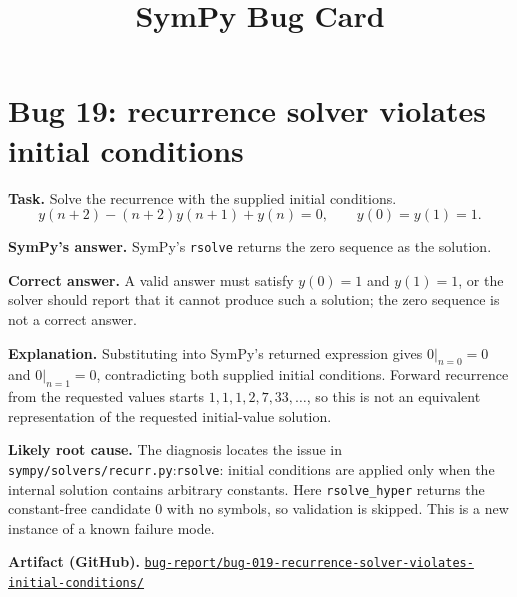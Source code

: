 \documentclass[11pt]{article}
\title{SymPy Bug Card}
\author{}
\date{}
\newcommand{\artifactrepo}{https://github.com/TODO-org/TODO-repo}
\newcommand{\bugbundle}[1]{\href{\artifactrepo/tree/main/bug-report/#1}{\nolinkurl{bug-report/#1/}}}
\begin{document}
\maketitle

\section*{Bug 19: recurrence solver violates initial conditions}

\begin{counterexamplebox}
\textbf{Task.} Solve the recurrence with the supplied initial conditions.
\[
 y(n+2)-(n+2)y(n+1)+y(n)=0,\qquad y(0)=y(1)=1 .
\]

\medskip
\textbf{SymPy's answer.}
SymPy's \texttt{rsolve} returns the zero sequence as the solution.

\medskip
\textbf{Correct answer.} A valid answer must satisfy \(y(0)=1\) and
\(y(1)=1\), or the solver should report that it cannot produce such a solution;
the zero sequence is not a correct answer.

\medskip
\textbf{Explanation.} Substituting into SymPy's returned expression gives
\(0|_{n=0}=0\) and \(0|_{n=1}=0\), contradicting both supplied initial
conditions.  Forward recurrence from the requested values starts
\(1,1,1,2,7,33,\ldots\), so this is not an equivalent representation of the
requested initial-value solution.

\medskip
\textbf{Likely root cause.} The diagnosis locates the issue in
\nolinkurl{sympy/solvers/recurr.py}:\texttt{rsolve}: initial conditions are
applied only when the internal solution contains arbitrary constants.  Here
\texttt{rsolve\_hyper} returns the constant-free candidate \(0\) with no
symbols, so validation is skipped.  This is a new instance of a known failure mode.

\medskip
\textbf{Artifact (GitHub).} \bugbundle{bug-019-recurrence-solver-violates-initial-conditions}
\end{counterexamplebox}
\end{document}
